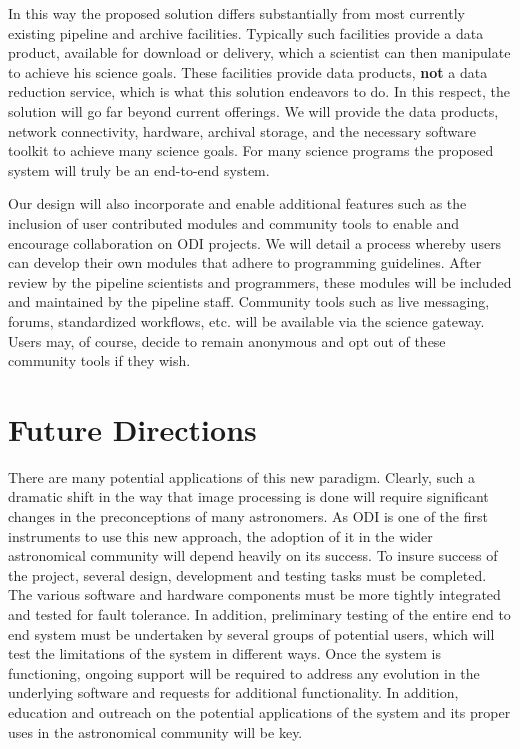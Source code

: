 \documentclass[10pt,conference]{IEEEtran}
\begin{document}
In this way the proposed solution differs substantially from most currently existing pipeline and archive facilities. Typically such facilities provide a data product, available for download or delivery, which a scientist can then manipulate to achieve his science goals. These facilities provide data products, {\bf not} a data reduction service, which is what this solution endeavors to do. In this respect, the solution will go far beyond current offerings. We will provide the data products, network connectivity, hardware, archival storage, and the necessary software toolkit to achieve many science goals. For many science programs the proposed system will truly be an end-to-end system.

Our design will also incorporate and enable additional features such as the inclusion of user contributed modules and community tools to enable and encourage collaboration on ODI projects. We will detail a process whereby users can develop their own modules that adhere to programming guidelines. After review by the pipeline scientists and programmers, these modules will be included and maintained by the pipeline staff. Community tools such as live messaging, forums, standardized workflows, etc. will be available via the science gateway. Users may, of course, decide to remain anonymous and opt out of these community tools if they wish. 

\section{Future Directions}\label{sec:future}

There are many potential applications of this new paradigm. Clearly, such a dramatic shift in the way that image processing is done will require significant changes in the preconceptions of many astronomers. As ODI is one of the first instruments to use this new approach, the adoption of it in the wider astronomical community will depend heavily on its success. To insure success of the project, several design, development and testing tasks must be completed. The various software and hardware components must be more tightly integrated and tested for fault tolerance. In addition, preliminary testing of the entire end to end system must be undertaken by several groups of potential users, which will test the limitations of the system in different ways. Once the system is functioning, ongoing support will be required to address any evolution in the underlying software and requests for additional functionality. In addition, education and outreach on the potential applications of the system and its proper uses in the astronomical community will be key. 
\end{document}
